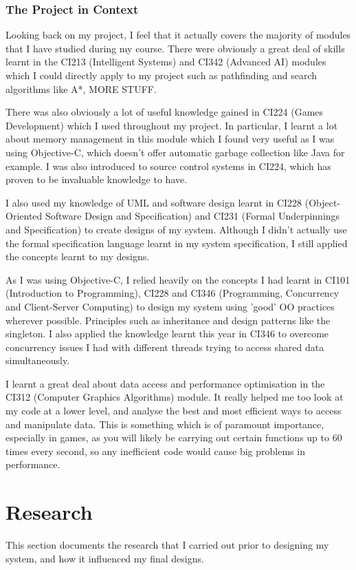 \documentclass[a4paper,oneside]{report}
\begin{document}
\section{The Project in Context}
	
Looking back on my project, I feel that it actually covers the majority of modules that I have studied during my course. There were obviously a great deal of skills learnt in the CI213 (Intelligent Systems) and CI342 (Advanced AI) modules which I could directly apply to my project such as pathfinding and search algorithms like A*, MORE STUFF. 

There was also obviously a lot of useful knowledge gained in CI224 (Games Development) which I used throughout my project. In particular, I learnt a lot about memory management in this module which I found very useful as I was using Objective-C, which doesn't offer automatic garbage collection like Java for example. I was also introduced to source control systems in CI224, which has proven to be invaluable knowledge to have.

I also used my knowledge of UML and software design learnt in CI228 (Object-Oriented Software Design and Specification) and CI231 (Formal Underpinnings and Specification) to create designs of my system. Although I didn't actually use the formal specification language learnt in my system specification, I still applied the concepts learnt to my designs.

As I was using Objective-C, I relied heavily on the concepts I had learnt in CI101 (Introduction to Programming), CI228 and CI346 (Programming, Concurrency and Client-Server Computing) to design my system using 'good' OO practices wherever possible. Principles such as inheritance and design patterns like the singleton. I also applied the knowledge learnt this year in CI346 to overcome concurrency issues I had with different threads trying to access shared data simultaneously.

I learnt a great deal about data access and performance optimisation in the CI312 (Computer Graphics Algorithms) module. It really helped me too look at my code at a lower level, and analyse the best and most efficient ways to access and manipulate data. This is something which is of paramount importance, especially in games, as you will likely be carrying out certain functions up to 60 times every second, so any inefficient code would cause big problems in performance. 

%
%
\part{Research}{This section documents the research that I carried out prior to designing my system, and how it influenced my final designs.}
\end{document}
